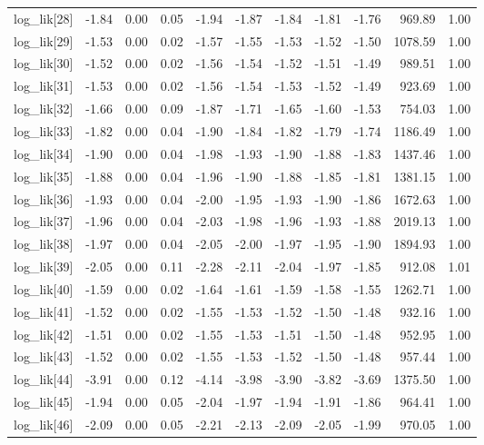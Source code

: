 \begin{table}[ht]
\begin{tabular}{rrrrrrrrrrr}
  log\_lik[28] & -1.84 & 0.00 & 0.05 & -1.94 & -1.87 & -1.84 & -1.81 & -1.76 & 969.89 & 1.00 \\ 
  log\_lik[29] & -1.53 & 0.00 & 0.02 & -1.57 & -1.55 & -1.53 & -1.52 & -1.50 & 1078.59 & 1.00 \\ 
  log\_lik[30] & -1.52 & 0.00 & 0.02 & -1.56 & -1.54 & -1.52 & -1.51 & -1.49 & 989.51 & 1.00 \\ 
  log\_lik[31] & -1.53 & 0.00 & 0.02 & -1.56 & -1.54 & -1.53 & -1.52 & -1.49 & 923.69 & 1.00 \\ 
  log\_lik[32] & -1.66 & 0.00 & 0.09 & -1.87 & -1.71 & -1.65 & -1.60 & -1.53 & 754.03 & 1.00 \\ 
  log\_lik[33] & -1.82 & 0.00 & 0.04 & -1.90 & -1.84 & -1.82 & -1.79 & -1.74 & 1186.49 & 1.00 \\ 
  log\_lik[34] & -1.90 & 0.00 & 0.04 & -1.98 & -1.93 & -1.90 & -1.88 & -1.83 & 1437.46 & 1.00 \\ 
  log\_lik[35] & -1.88 & 0.00 & 0.04 & -1.96 & -1.90 & -1.88 & -1.85 & -1.81 & 1381.15 & 1.00 \\ 
  log\_lik[36] & -1.93 & 0.00 & 0.04 & -2.00 & -1.95 & -1.93 & -1.90 & -1.86 & 1672.63 & 1.00 \\ 
  log\_lik[37] & -1.96 & 0.00 & 0.04 & -2.03 & -1.98 & -1.96 & -1.93 & -1.88 & 2019.13 & 1.00 \\ 
  log\_lik[38] & -1.97 & 0.00 & 0.04 & -2.05 & -2.00 & -1.97 & -1.95 & -1.90 & 1894.93 & 1.00 \\ 
  log\_lik[39] & -2.05 & 0.00 & 0.11 & -2.28 & -2.11 & -2.04 & -1.97 & -1.85 & 912.08 & 1.01 \\ 
  log\_lik[40] & -1.59 & 0.00 & 0.02 & -1.64 & -1.61 & -1.59 & -1.58 & -1.55 & 1262.71 & 1.00 \\ 
  log\_lik[41] & -1.52 & 0.00 & 0.02 & -1.55 & -1.53 & -1.52 & -1.50 & -1.48 & 932.16 & 1.00 \\ 
  log\_lik[42] & -1.51 & 0.00 & 0.02 & -1.55 & -1.53 & -1.51 & -1.50 & -1.48 & 952.95 & 1.00 \\ 
  log\_lik[43] & -1.52 & 0.00 & 0.02 & -1.55 & -1.53 & -1.52 & -1.50 & -1.48 & 957.44 & 1.00 \\ 
  log\_lik[44] & -3.91 & 0.00 & 0.12 & -4.14 & -3.98 & -3.90 & -3.82 & -3.69 & 1375.50 & 1.00 \\ 
  log\_lik[45] & -1.94 & 0.00 & 0.05 & -2.04 & -1.97 & -1.94 & -1.91 & -1.86 & 964.41 & 1.00 \\ 
  log\_lik[46] & -2.09 & 0.00 & 0.05 & -2.21 & -2.13 & -2.09 & -2.05 & -1.99 & 970.05 & 1.00 \\ 

\end{tabular}
\end{table}
